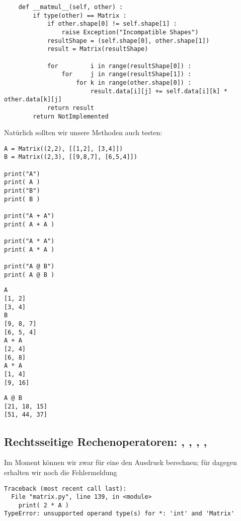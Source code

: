 \begin{codebox}
\begin{verbatim}
    def __matmul__(self, other) :
        if type(other) == Matrix :
            if other.shape[0] != self.shape[1] :
                raise Exception("Incompatible Shapes")
            resultShape = (self.shape[0], other.shape[1])
            result = Matrix(resultShape)
            
            for         i in range(resultShape[0]) :
                for     j in range(resultShape[1]) :
                    for k in range(other.shape[0]) :
                        result.data[i][j] += self.data[i][k] * other.data[k][j]
            return result
        return NotImplemented
\end{verbatim}
\end{codebox}

Natürlich sollten wir unsere Methoden auch testen:

\begin{codebox}
\begin{verbatim}
A = Matrix((2,2), [[1,2], [3,4]])
B = Matrix((2,3), [[9,8,7], [6,5,4]])

print("A")
print( A )
print("B")
print( B )

print("A + A")
print( A + A )

print("A * A")
print( A * A )

print("A @ B")
print( A @ B )
\end{verbatim}
\end{codebox}

\begin{cmdbox}
\begin{verbatim}
A
[1, 2]
[3, 4]
B
[9, 8, 7]
[6, 5, 4]
A + A
[2, 4]
[6, 8]
A * A
[1, 4]
[9, 16]
\end{verbatim}
\end{cmdbox}
%
\begin{cmdbox}[]
\begin{verbatim}
A @ B
[21, 18, 15]
[51, 44, 37]
\end{verbatim}
\end{cmdbox}

\subsection{Rechtsseitige Rechenoperatoren: , , , , }
Im Moment können wir zwar für eine  den Ausdruck  berechnen; für  dagegen erhalten wir noch die Fehlermeldung
\begin{cmdbox}
\begin{verbatim}
Traceback (most recent call last):
  File "matrix.py", line 139, in <module>
    print( 2 * A )
TypeError: unsupported operand type(s) for *: 'int' and 'Matrix'
\end{verbatim}
\end{cmdbox}

